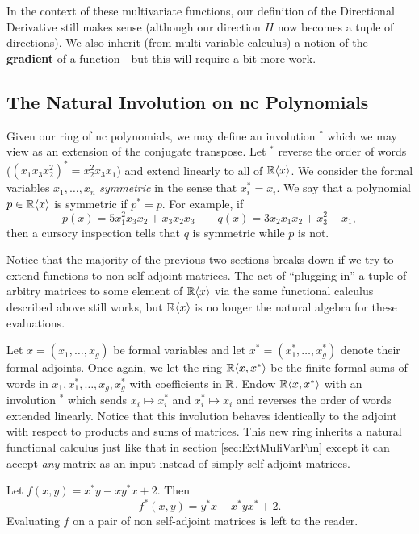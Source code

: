 In the context of these multivariate functions, our definition of the
Directional Derivative still makes sense (although our direction \(H\) now
becomes a tuple of directions). We also inherit (from multi-variable calculus) a
notion of the \textbf{gradient} of a function---but this will require a bit more work.

\subsection{The Natural Involution on nc Polynomials}%
\label{ssec:NatInvo}

Given our ring of nc polynomials, we may define an involution \(^*\) which we
may view as an extension of the conjugate transpose. Let \(^*\) reverse the
order of words (\ie \((x_1x_3x_2^2)^* = x_2^2x_3x_1\)) and extend linearly to
all of \(\mathbb{R} \langle x \rangle \). We consider the formal
variables \(x_1, \dots , x_n\) \emph{symmetric} in the sense that
\(x_i^* = x_i\). We say that a polynomial \(p \in \mathbb{R} \langle x \rangle \) is
symmetric if \(p^* = p\). For example, if
\[
  p(x) = 5x_1^2x_3x_2 + x_3x_2x_3 \qquad q(x) = 3x_2x_1x_2 + x_3^2 - x_1 ,
\]
then a cursory inspection tells that \(q\) is symmetric while \(p\) is not.

Notice that the majority of the previous two sections breaks down if we try to
extend functions to non-self-adjoint matrices. The act of ``plugging in''
a tuple of arbitry matrices to some element of \(\mathbb{R} \langle x \rangle \) via the same
functional calculus described above still works, but \(\mathbb{R} \langle x \rangle \)
is no longer the natural algebra for these evaluations.

Let \(x = (x_1, \dots, x_g)\) be formal variables and let
\(x^* = (x_1^*, \dots, x_g^*)\) denote their formal adjoints. Once again, we let
the ring \(\mathbb{R} \langle x,x^* \rangle \) be the finite formal sums of words in
\(x_1,x_1^*, \dots , x_g,x_g^*\) with coefficients in \(\mathbb{R} \). Endow
\(\mathbb{R} \langle x,x^* \rangle \) with an involution \(^*\) which sends
\(x_i \mapsto x_i^*\) and \(x_i^* \mapsto x_i\) and reverses the order of words
extended linearly. Notice that this involution behaves identically to the
adjoint with respect to products and sums of matrices. This new ring inherits a
natural functional calculus just like that in section \ref{sec:ExtMuliVarFun}
except it can accept \emph{any} matrix as an input instead of simply
self-adjoint matrices.

\begin{example}
  Let \(f(x,y) = x^*y - x y^* x +2\). Then
  \[
    f^*(x,y) = y^*x - x^*yx^* + 2.
  \]
  Evaluating \(f\) on a pair of non self-adjoint matrices is left to the reader.
\end{example}

